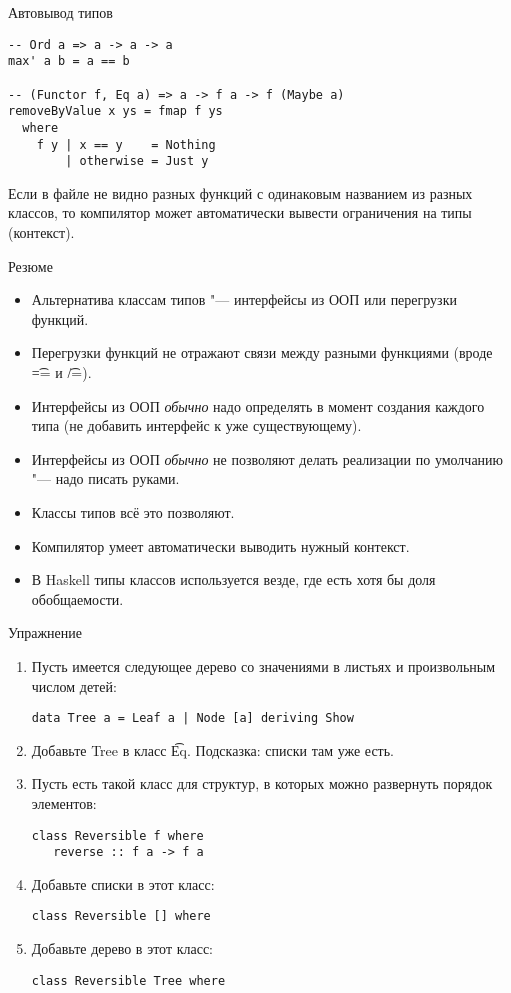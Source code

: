 \begin{frame}[fragile]{Автовывод типов}
\begin{verbatim}
-- Ord a => a -> a -> a
max' a b = a == b

-- (Functor f, Eq a) => a -> f a -> f (Maybe a)
removeByValue x ys = fmap f ys
  where
    f y | x == y    = Nothing
        | otherwise = Just y
\end{verbatim}
	Если в файле не видно разных функций с одинаковым названием из разных классов, то компилятор может автоматически вывести ограничения на типы (контекст).
\end{frame}

\begin{frame}[fragile]{Резюме}
	\begin{itemize}
		\item Альтернатива классам типов "--- интерфейсы из ООП или перегрузки функций.
		\item Перегрузки функций не отражают связи между разными функциями (вроде \t{==} и \t{/=}).
		\item Интерфейсы из ООП \textit{обычно} надо определять в момент создания каждого типа (не добавить интерфейс к уже существующему).
		\item Интерфейсы из ООП \textit{обычно} не позволяют делать реализации по умолчанию "--- надо писать руками.
		\item Классы типов всё это позволяют.
		\item Компилятор умеет автоматически выводить нужный контекст.
		\item В Haskell типы классов используется везде, где есть хотя бы доля обобщаемости.
	\end{itemize}
\end{frame}

\begin{frame}[fragile]{Упражнение}
	\begin{enumerate}
		\item Пусть имеется следующее дерево со значениями в листьях и произвольным числом детей:
\begin{verbatim}
data Tree a = Leaf a | Node [a] deriving Show
\end{verbatim}
		\item Добавьте Tree в класс \t{Eq}. Подсказка: списки там уже есть.
		\item Пусть есть такой класс для структур, в которых можно развернуть порядок элементов:
\begin{verbatim}
class Reversible f where
   reverse :: f a -> f a
\end{verbatim}
		\item Добавьте списки в этот класс:
\begin{verbatim}
class Reversible [] where
\end{verbatim}
		\item Добавьте дерево в этот класс:
\begin{verbatim}
class Reversible Tree where
\end{verbatim}
	\end{enumerate}
\end{frame}
